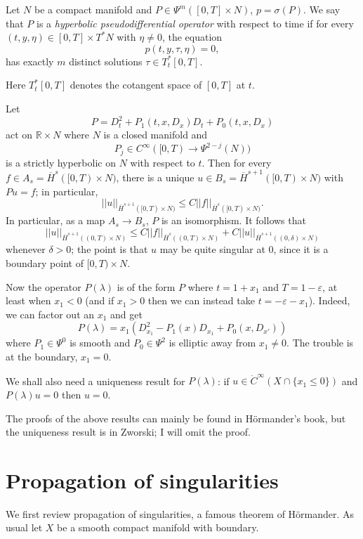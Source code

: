 \documentclass[12pt]{article}
\newcommand{\RR}{\mathbb{R}}
\begin{document}
\begin{definition}
Let $N$ be a compact manifold and $P \in \Psi^m([0, T] \times N)$, $p = \sigma(P)$.
We say that $P$ is a \emph{hyperbolic pseudodifferential operator} with respect to time if for every $(t, y, \eta) \in [0, T] \times T^*N$ with $\eta \neq 0$, the equation
$$p(t, y, \tau, \eta) = 0,$$
has exactly $m$ distinct solutions $\tau \in T_t^*[0, T]$.
\end{definition}

Here $T_t^*[0, T]$ denotes the cotangent space of $[0, T]$ at $t$.

Let
$$P = D_t^2 + P_1(t, x, D_x)D_t + P_0(t, x, D_x)$$
act on $\RR \times N$ where $N$ is a closed manifold and
$$P_j \in C^\infty([0, T) \to \Psi^{2-j}(N))$$
is a strictly hyperbolic on $N$ with respect to $t$. Then for every $f \in A_s = \overline H^s([0, T) \times N)$, there is a unique $u \in B_s = \overline H^{s+1}([0, T) \times N)$ with $Pu = f$; in particular,
$$||u||_{\overline H^{s+1}([0, T) \times N)} \leq C ||f||_{\overline H^s([0, T) \times N)}.$$
In particular, as a map $A_s \to B_s$, $P$ is an isomorphism.
It follows that
$$||u||_{\overline H^{s+1}((0, T) \times N)} \leq C ||f||_{\overline H^s((0, T) \times N)} + C ||u||_{\overline H^{s+1}((0, \delta) \times N)}$$
whenever $\delta > 0$; the point is that $u$ may be quite singular at $0$, since it is a boundary point of $[0, T) \times N$.

Now the operator $P(\lambda)$ is of the form $P$ where $t = 1 + x_1$ and $T = 1 - \varepsilon$, at least when $x_1 < 0$ (and if $x_1 > 0$ then we can instead take $t = -\varepsilon-x_1$).
Indeed, we can factor out an $x_1$ and get
$$P(\lambda) = x_1(D_{x_1}^2 - P_1(x)D_{x_1} + P_0(x, D_{x'}))$$
where $P_1 \in \Psi^0$ is smooth and $P_0 \in \Psi^2$ is elliptic away from $x_1 \neq 0$.
The trouble is at the boundary, $x_1 = 0$.

We shall also need a uniqueness result for $P(\lambda)$: if $u \in \dot C^\infty(X \cap \{x_1 \leq 0\})$ and $P(\lambda)u = 0$ then $u = 0$.

The proofs of the above results can mainly be found in H\"ormander's book, but the uniqueness result is in Zworski; I will omit the proof.

\section{Propagation of singularities}
We first review propagation of singularities, a famous theorem of H\"ormander.
As usual let $X$ be a smooth compact manifold with boundary.
\end{document}
